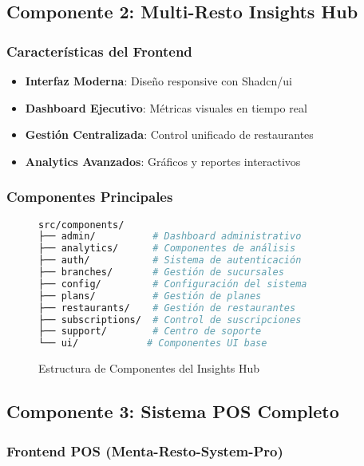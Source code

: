 \documentclass[12pt,a4paper]{article}
\begin{document}
\subsection{Componente 2: Multi-Resto Insights Hub}

\subsubsection{Características del Frontend}

\begin{itemize}
    \item \textbf{Interfaz Moderna}: Diseño responsive con Shadcn/ui
    \item \textbf{Dashboard Ejecutivo}: Métricas visuales en tiempo real
    \item \textbf{Gestión Centralizada}: Control unificado de restaurantes
    \item \textbf{Analytics Avanzados}: Gráficos y reportes interactivos
\end{itemize}

\subsubsection{Componentes Principales}

\begin{figure}[H]
\centering
\begin{lstlisting}[language=bash]
src/components/
├── admin/          # Dashboard administrativo
├── analytics/      # Componentes de análisis
├── auth/           # Sistema de autenticación
├── branches/       # Gestión de sucursales
├── config/         # Configuración del sistema
├── plans/          # Gestión de planes
├── restaurants/    # Gestión de restaurantes
├── subscriptions/  # Control de suscripciones
├── support/        # Centro de soporte
└── ui/            # Componentes UI base
\end{lstlisting}
\caption{Estructura de Componentes del Insights Hub}
\end{figure}

\subsection{Componente 3: Sistema POS Completo}

\subsubsection{Frontend POS (Menta-Resto-System-Pro)}
\end{document}
